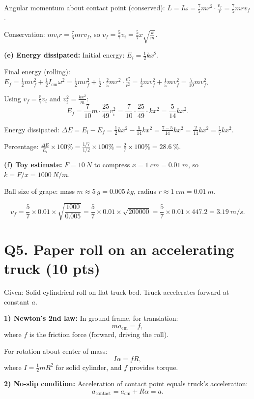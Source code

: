 \documentclass[11pt]{article}
\newcommand{\ans}[1]{\boxed{\displaystyle #1}}
\begin{document}
Angular momentum about contact point (conserved): $L = I\omega = \frac{7}{5}mr^2 \cdot \frac{v_f}{r} = \frac{7}{5}mrv_f$.

Conservation: $mv_i r = \frac{7}{5}mrv_f$, so $v_f = \frac{5}{7}v_i = \ans{\frac{5}{7}x\sqrt{\frac{k}{m}}}$.

\textbf{(e) Energy dissipated:} Initial energy: $E_i = \frac{1}{2}kx^2$.

Final energy (rolling): $E_f = \frac{1}{2}mv_f^2 + \frac{1}{2}I_{\text{cm}}\omega^2 = \frac{1}{2}mv_f^2 + \frac{1}{2} \cdot \frac{2}{5}mr^2 \cdot \frac{v_f^2}{r^2} = \frac{1}{2}mv_f^2 + \frac{1}{5}mv_f^2 = \frac{7}{10}mv_f^2$.

Using $v_f = \frac{5}{7}v_i$ and $v_i^2 = \frac{kx^2}{m}$:
\[ E_f = \frac{7}{10}m \cdot \frac{25}{49}v_i^2 = \frac{7}{10} \cdot \frac{25}{49} \cdot kx^2 = \frac{5}{14}kx^2. \]

Energy dissipated: $\Delta E = E_i - E_f = \frac{1}{2}kx^2 - \frac{5}{14}kx^2 = \frac{7-5}{14}kx^2 = \frac{2}{14}kx^2 = \frac{1}{7}kx^2$.

Percentage: $\frac{\Delta E}{E_i} \times 100\% = \frac{1/7}{1/2} \times 100\% = \frac{2}{7} \times 100\% = \ans{\SI{28.6}{\percent}}$.

\textbf{(f) Toy estimate:} $F = \SI{10}{N}$ to compress $x = \SI{1}{cm} = \SI{0.01}{m}$, so $k = F/x = \SI{1000}{N/m}$.

Ball size of grape: mass $m \approx \SI{5}{g} = \SI{0.005}{kg}$, radius $r \approx \SI{1}{cm} = \SI{0.01}{m}$.

\[ v_f = \frac{5}{7} \times 0.01 \times \sqrt{\frac{1000}{0.005}} = \frac{5}{7} \times 0.01 \times \sqrt{200000} = \frac{5}{7} \times 0.01 \times 447.2 = \ans{\SI{3.19}{m/s}}. \]

\section*{Q5. Paper roll on an accelerating truck (10 pts)}
Given: Solid cylindrical roll on flat truck bed. Truck accelerates forward at constant $a$.

\textbf{1) Newton's 2nd law:} In ground frame, for translation:
\[ ma_{\text{cm}} = f, \]
where $f$ is the friction force (forward, driving the roll).

For rotation about center of mass:
\[ I\alpha = fR, \]
where $I = \frac{1}{2}mR^2$ for solid cylinder, and $f$ provides torque.

\textbf{2) No-slip condition:} Acceleration of contact point equals truck's acceleration:
\[ a_{\text{contact}} = a_{\text{cm}} + R\alpha = a. \]
\end{document}
